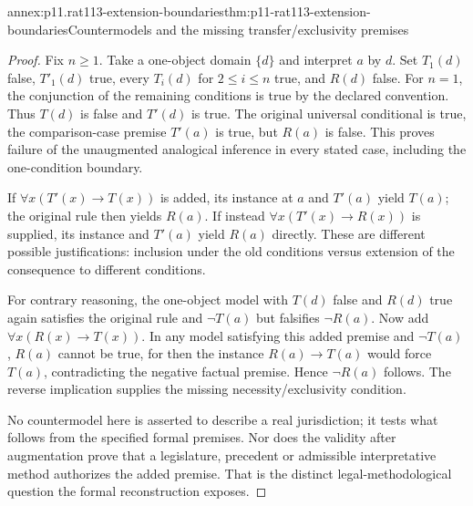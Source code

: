 \begin{annexitem}{annex:p11.rat113-extension-boundaries}{thm:p11-rat113-extension-boundaries}{Countermodels and the missing transfer/exclusivity premises}
\begin{proof}
Fix \(n\geq1\). Take a one-object domain \(\{d\}\) and interpret
\(a\) by \(d\). Set \(T_1(d)\) false, \(T'_1(d)\) true,
every \(T_i(d)\) for \(2\leq i\leq n\) true, and \(R(d)\)
false. For \(n=1\), the conjunction of the remaining conditions is
true by the declared convention. Thus \(T(d)\) is false and
\(T'(d)\) is true. The original universal conditional is true, the
comparison-case premise \(T'(a)\) is true, but \(R(a)\) is false.
This proves failure of the unaugmented analogical inference in every
stated case, including the one-condition boundary.

If \(\forall x(T'(x)\to T(x))\) is added, its instance at \(a\)
and \(T'(a)\) yield \(T(a)\); the original rule then yields
\(R(a)\). If instead \(\forall x(T'(x)\to R(x))\) is supplied,
its instance and \(T'(a)\) yield \(R(a)\) directly. These are
different possible justifications: inclusion under the old conditions
versus extension of the consequence to different conditions.

For contrary reasoning, the one-object model with \(T(d)\) false and
\(R(d)\) true again satisfies the original rule and \(\neg T(a)\)
but falsifies \(\neg R(a)\). Now add
\(\forall x(R(x)\to T(x))\). In any model satisfying this added
premise and \(\neg T(a)\), \(R(a)\) cannot be true, for then the
instance \(R(a)\to T(a)\) would force \(T(a)\), contradicting the
negative factual premise. Hence \(\neg R(a)\) follows. The reverse
implication supplies the missing necessity/exclusivity condition.

No countermodel here is asserted to describe a real jurisdiction; it tests
what follows from the specified formal premises. Nor does the validity
after augmentation prove that a legislature, precedent or admissible
interpretative method authorizes the added premise. That is the distinct
legal-methodological question the formal reconstruction exposes.
\end{proof}
\end{annexitem}
